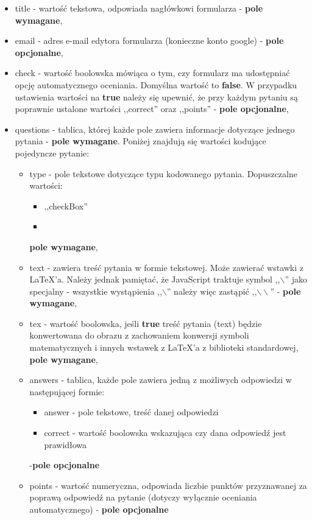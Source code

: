 \begin{itemize}
\item{title} - wartość tekstowa, odpowiada nagłówkowi formularza -  \textbf{pole wymagane},
\item{email} - adres e-mail edytora formularza (konieczne konto google) - \textbf{pole opcjonalne},
\item{check} - wartość boolowska mówiąca o tym, czy formularz ma udostępniać opcję automatycznego oceniania. Domyślna wartość to \textbf{false}. W przypadku ustawienia wartości na \textbf{true} należy się upewnić, że przy każdym pytaniu są poprawnie ustalone wartości ,,correct'' oraz ,,points'' - \textbf{pole opcjonalne},
\item{questions} - tablica, której każde pole zawiera informacje dotyczące jednego pytania - \textbf{pole wymagane}. Poniżej znajdują się wartości kodujące pojedyncze pytanie:
\begin{itemize}
\item{type} - pole tekstowe dotyczące typu kodowanego pytania. Dopuszczalne wartości:
\begin{itemize}
\item ,,checkBox''%
\item
\end{itemize}
 \textbf{pole wymagane},
\item{text} - zawiera treść pytania w formie tekstowej. Może zawierać wstawki z \LaTeX{}'a. Należy jednak pamiętać, że JavaScript traktuje symbol ,,$\backslash$'' jako specjalny - wszystkie wystąpienia ,,$\backslash$'' należy więc zastąpić ,,$\backslash\backslash$'' - \textbf{pole wymagane},
\item{tex} - wartość boolowska, jeśli \textbf{true} treść pytania (text) będzie konwertowana do obrazu z zachowaniem konwersji symboli matematycznych i innych wstawek z \LaTeX{}'a z biblioteki standardowej, \textbf{pole wymagane},
\item{answers} - tablica, każde pole zawiera jedną z możliwych odpowiedzi w następującej formie:
\begin{itemize}
\item answer - pole tekstowe, treść danej odpowiedzi
\item correct - wartość boolowska wskazująca czy dana odpowiedź jest prawidłowa
\end{itemize} 
-\textbf{pole opcjonalne}
\item{points} - wartość numeryczna, odpowiada liczbie punktów przyznawanej za poprawą odpowiedź na pytanie (dotyczy wyłącznie oceniania automatycznego) - \textbf{pole opcjonalne}
\end{itemize}
\end{itemize}









